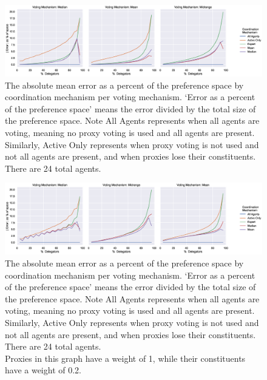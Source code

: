 \begin{landscape}
    \begin{figure}[p]
        \centering
        \includegraphics[scale=0.55]
        {content/chapter2/figures/vm_col_cm_hue_error_as_percent_of_space_abs_mean}
        \caption{
            The absolute mean error as a percent of the preference space by
            coordination mechanism per voting mechanism.
            `Error as a percent of the preference space' means the error divided by
            the total size of the preference space.
            Note All Agents represents when all agents are voting, meaning no proxy
            voting is used and all agents are present.
            Similarly, Active Only represents when proxy voting is not used and not
            all agents are present, and when proxies lose their constituents.
            There are 24 total agents.
        }
        \label{fig:vm-col-cm-hue-error-as-percent-of-space-abs-mean}
    \end{figure}

    \begin{figure}[p]
        \centering
        \includegraphics[scale=0.55]
        {content/chapter2/figures/different_weight/vm_col_cm_hue_error_as_percent_of_space_abs_mean}
        \caption{
            The absolute mean error as a percent of the preference space by
            coordination mechanism per voting mechanism.
            `Error as a percent of the preference space' means the error divided by
            the total size of the preference space.
            Note All Agents represents when all agents are voting, meaning no proxy
            voting is used and all agents are present.
            Similarly, Active Only represents when proxy voting is not used and not
            all agents are present, and when proxies lose their constituents.
            There are 24 total agents.
            \\
            Proxies in this graph have a weight of 1, while their constituents have a
            weight of 0.2.
        }
        \label{fig:different-weight-vm-col-cm-hue-error-as-percent-of-space-abs-mean}
    \end{figure}
\end{landscape}

